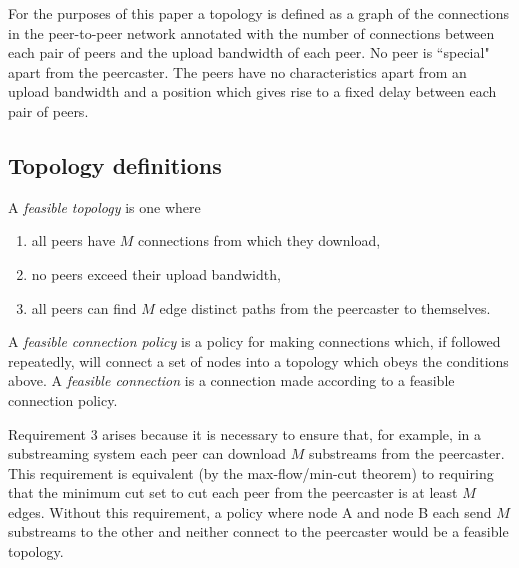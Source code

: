 For the purposes of this paper a topology is defined as a graph of the connections
in the peer-to-peer network annotated with the number of connections between each
pair of peers and the upload bandwidth of each peer.  No peer is ``special" apart
from the peercaster.  The peers have no characteristics apart from an upload
bandwidth and a position which gives rise to a fixed delay between each pair of
peers.

\subsection{Topology definitions}

\begin{definition} \label{defn:feasible}
A {\em feasible topology\/} is one where
\begin{enumerate}
\item all peers have $M$ connections from which they download,
\item no peers exceed their upload bandwidth,
\item all peers can find $M$ edge distinct paths from the peercaster to themselves.
\end{enumerate}
A {\em feasible connection policy\/} is a policy for making connections which,
if followed repeatedly, will connect a set of nodes into a topology which obeys
the conditions above.  A {\em feasible connection\/} is a connection made
according to a feasible connection policy.
\end{definition}

\begin{remark}
Requirement 3 arises because it is necessary to ensure that, for example, in a
substreaming system each peer can download $M$ substreams from the peercaster.
This requirement is equivalent (by the max-flow/min-cut theorem) to requiring
that the minimum cut set to cut each peer from the peercaster is at least $M$ 
edges.
Without this requirement, a policy where node A and node B each send $M$ substreams
to the other and neither connect to the peercaster would be a feasible topology. 
\end{remark}

